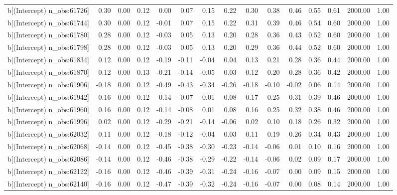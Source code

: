 \begin{table}[ht]
\begin{tabular}{rrrrrrrrrrrrrrr}
  b[(Intercept) n\_obs:61726] & 0.30 & 0.00 & 0.12 & 0.00 & 0.07 & 0.15 & 0.22 & 0.30 & 0.38 & 0.46 & 0.55 & 0.61 & 2000.00 & 1.00 \\ 
  b[(Intercept) n\_obs:61744] & 0.30 & 0.00 & 0.12 & -0.01 & 0.07 & 0.15 & 0.22 & 0.31 & 0.39 & 0.46 & 0.54 & 0.60 & 2000.00 & 1.00 \\ 
  b[(Intercept) n\_obs:61780] & 0.28 & 0.00 & 0.12 & -0.03 & 0.05 & 0.13 & 0.20 & 0.28 & 0.36 & 0.43 & 0.52 & 0.60 & 2000.00 & 1.00 \\ 
  b[(Intercept) n\_obs:61798] & 0.28 & 0.00 & 0.12 & -0.03 & 0.05 & 0.13 & 0.20 & 0.29 & 0.36 & 0.44 & 0.52 & 0.60 & 2000.00 & 1.00 \\ 
  b[(Intercept) n\_obs:61834] & 0.12 & 0.00 & 0.12 & -0.19 & -0.11 & -0.04 & 0.04 & 0.13 & 0.21 & 0.28 & 0.36 & 0.44 & 2000.00 & 1.00 \\ 
  b[(Intercept) n\_obs:61870] & 0.12 & 0.00 & 0.13 & -0.21 & -0.14 & -0.05 & 0.03 & 0.12 & 0.20 & 0.28 & 0.36 & 0.42 & 2000.00 & 1.00 \\ 
  b[(Intercept) n\_obs:61906] & -0.18 & 0.00 & 0.12 & -0.49 & -0.43 & -0.34 & -0.26 & -0.18 & -0.10 & -0.02 & 0.06 & 0.14 & 2000.00 & 1.00 \\ 
  b[(Intercept) n\_obs:61942] & 0.16 & 0.00 & 0.12 & -0.14 & -0.07 & 0.01 & 0.08 & 0.17 & 0.25 & 0.31 & 0.39 & 0.46 & 2000.00 & 1.00 \\ 
  b[(Intercept) n\_obs:61960] & 0.16 & 0.00 & 0.12 & -0.14 & -0.08 & 0.01 & 0.08 & 0.16 & 0.25 & 0.32 & 0.38 & 0.46 & 2000.00 & 1.00 \\ 
  b[(Intercept) n\_obs:61996] & 0.02 & 0.00 & 0.12 & -0.29 & -0.21 & -0.14 & -0.06 & 0.02 & 0.10 & 0.18 & 0.26 & 0.32 & 2000.00 & 1.00 \\ 
  b[(Intercept) n\_obs:62032] & 0.11 & 0.00 & 0.12 & -0.18 & -0.12 & -0.04 & 0.03 & 0.11 & 0.19 & 0.26 & 0.34 & 0.43 & 2000.00 & 1.00 \\ 
  b[(Intercept) n\_obs:62068] & -0.14 & 0.00 & 0.12 & -0.45 & -0.38 & -0.30 & -0.23 & -0.14 & -0.06 & 0.01 & 0.10 & 0.16 & 2000.00 & 1.00 \\ 
  b[(Intercept) n\_obs:62086] & -0.14 & 0.00 & 0.12 & -0.46 & -0.38 & -0.29 & -0.22 & -0.14 & -0.06 & 0.02 & 0.09 & 0.17 & 2000.00 & 1.00 \\ 
  b[(Intercept) n\_obs:62122] & -0.16 & 0.00 & 0.12 & -0.46 & -0.39 & -0.31 & -0.24 & -0.16 & -0.07 & 0.00 & 0.09 & 0.15 & 2000.00 & 1.00 \\ 
  b[(Intercept) n\_obs:62140] & -0.16 & 0.00 & 0.12 & -0.47 & -0.39 & -0.32 & -0.24 & -0.16 & -0.07 & 0.00 & 0.08 & 0.14 & 2000.00 & 1.00 \\ 

\end{tabular}
\end{table}
